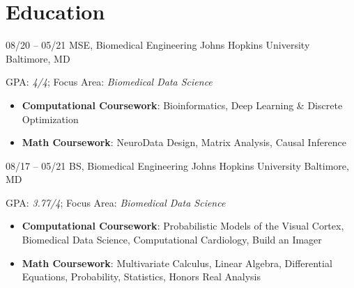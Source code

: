 \section{Education}

\cventry
{08/20 -- 05/21}
{MSE, Biomedical Engineering}
{Johns Hopkins University}
{Baltimore, MD}
{}
{
GPA: \textit{4/4}; 
Focus Area: \textit{Biomedical Data Science}
\begin{itemize}
    \item {\textbf{Computational Coursework}: Bioinformatics, Deep Learning \& Discrete Optimization}
    \item {\textbf{Math Coursework}: NeuroData Design, Matrix Analysis, Causal Inference}
\end{itemize}
}

\cventry
{08/17 -- 05/21}
{BS, Biomedical Engineering}
{Johns Hopkins University}
{Baltimore, MD}
{}
{
GPA: \textit{3.77/4}; 
Focus Area: \textit{Biomedical Data Science}
\begin{itemize}
    \item {\textbf{Computational Coursework}: Probabilistic Models of the Visual Cortex, Biomedical Data Science, Computational Cardiology, Build an Imager}
    \item {\textbf{Math Coursework}: Multivariate Calculus, Linear Algebra, Differential Equations, Probability, Statistics, Honors Real Analysis}
\end{itemize}
}
